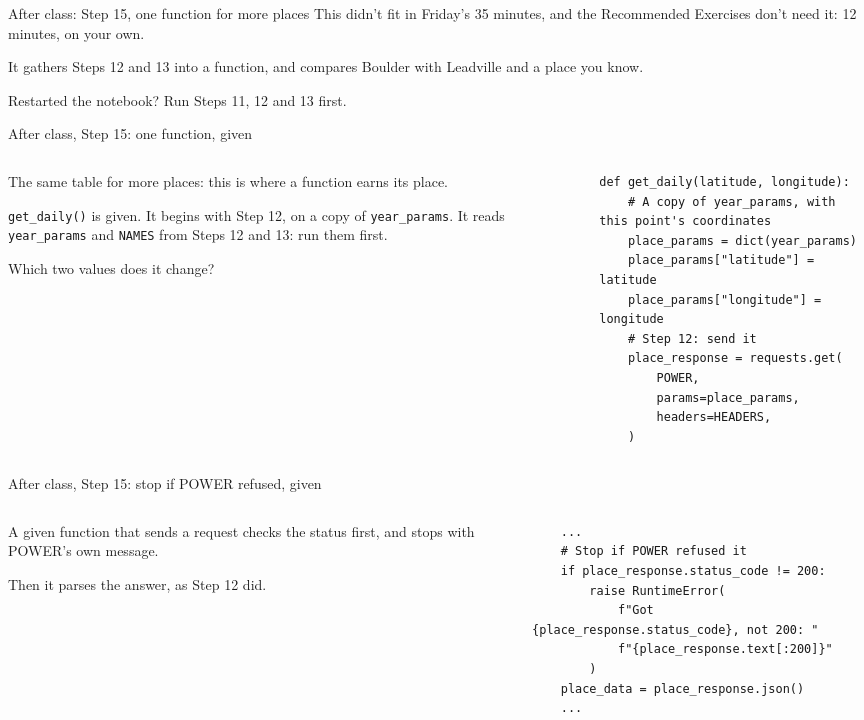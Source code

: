 \documentclass[9pt,aspectratio=169]{beamer}
\begin{document}
\begin{frame}{After class: Step 15, one function for more places}
    This didn't fit in Friday's 35 minutes, and the Recommended Exercises don't need it: 12 minutes, on your own.

    \medskip
    It gathers Steps 12 and 13 into a function, and compares Boulder with Leadville and a place you know.

    \medskip
    Restarted the notebook? Run Steps 11, 12 and 13 first.
\end{frame}

\begin{frame}[fragile]{After class, Step 15: one function, given}
    \begin{columns}[T]
        \begin{column}{0.37\textwidth}
            The same table for more places: this is where a function earns its place.

            \medskip
            \texttt{get\_daily()} is given. It begins with Step 12, on a copy of \texttt{year\_params}. It reads \texttt{year\_params} and \texttt{NAMES} from Steps 12 and 13: run them first.

            \medskip
            Which two values does it change?
        \end{column}
        \begin{column}{0.6\textwidth}
\begin{lstlisting}
def get_daily(latitude, longitude):
    # A copy of year_params, with this point's coordinates
    place_params = dict(year_params)
    place_params["latitude"] = latitude
    place_params["longitude"] = longitude
    # Step 12: send it
    place_response = requests.get(
        POWER,
        params=place_params,
        headers=HEADERS,
    )
\end{lstlisting}
        \end{column}
    \end{columns}
\end{frame}

\begin{frame}[fragile]{After class, Step 15: stop if POWER refused, given}
    \begin{columns}[T]
        \begin{column}{0.37\textwidth}
            A given function that sends a request checks the status first, and stops with POWER's own message.

            \medskip
            Then it parses the answer, as Step 12 did.
        \end{column}
        \begin{column}{0.6\textwidth}
\begin{lstlisting}
    ...
    # Stop if POWER refused it
    if place_response.status_code != 200:
        raise RuntimeError(
            f"Got {place_response.status_code}, not 200: "
            f"{place_response.text[:200]}"
        )
    place_data = place_response.json()
    ...
\end{lstlisting}
        \end{column}
    \end{columns}
\end{frame}
\end{document}
